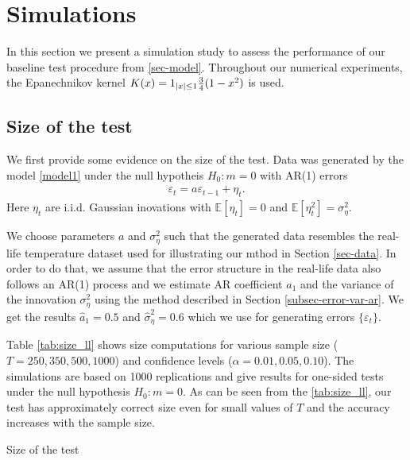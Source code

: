 
\section{Simulations}\label{sec-sim}
In this section we present a simulation study to assess the performance of our baseline test procedure from \ref{sec-model}. Throughout our numerical experiments, the Epanechnikov kernel $K(x) = 1_{|x|\leq 1} \frac{3}{4} (1 - x^2)$ is used.

\subsection{Size of the test}\label{subsec-sim-size}
We first provide some evidence on the size of the test. Data was generated by the model \ref{model1} under the null hypotheis $H_0: m=0$ with AR(1) errors
\begin{align*}
\varepsilon_t = a \varepsilon_{t-1} + \eta_t.
\end{align*}
Here $\eta_t$ are i.i.d. Gaussian inovations with $\mathbb{E}[\eta_t] = 0$ and $\mathbb{E}[\eta_t^2] = \sigma_{\eta}^2$.

We choose parameters $a$ and $ \sigma_{\eta}^2$ such that the generated data resembles the real-life temperature dataset used for illustrating our mthod in Section \ref{sec-data}. In order to do that, we assume that the error structure in the real-life data also follows an AR(1) process and we estimate AR coefficient $a_1$ and the variance of the innovation $\sigma_{\eta}^2$ using the method described in Section \ref{subsec-error-var-ar}. We get the results $\hat{a}_1 = 0.5$ and $\hat{\sigma}_{\eta}^2 = 0.6$ which we use for generating errors $\{\varepsilon_t\}$.

Table \ref{tab:size_ll} shows size computations for various sample size ($T = 250, 350, 500, 1000$) and confidence levels ($\alpha = 0.01, 0.05, 0.10$). The simulations are based on 1000 replications and give results for one-sided tests under the null hypothesis $H_0: m=0$. As can be seen from the \ref{tab:size_ll}, our test has approximately correct size even for small values of $T$ and the accuracy increases with the sample size.
 
\begin{table}[H]
    \begin{center}
        \caption{Size of the test}
        \label{tab:size_ll}
        \centering
        
    \end{center}
\end{table}

